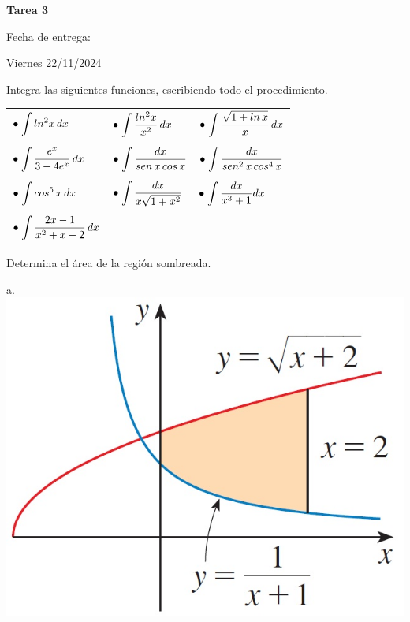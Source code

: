 \documentclass[9pt]{exam}
\begin{document}
\centering


\Large 
\textbf{Tarea 3}

\normalsize
\normalsize
Fecha de entrega: 

Viernes 22/11/2024 



\pointformat{\bfseries\boldmath(\thepoints)}
\vskip10pt

\begin{questions}
   \question Integra las siguientes funciones, escribiendo todo el procedimiento. 
    \vskip10pt
    
    \begin{tabular}{p{5cm}p{5cm}p{5cm}}
         $\bullet\;\mathlarger{\int ln^2x\,dx}$&$\bullet\;\mathlarger{\int \frac{ln^2x}{x^2}\,dx}$&$\bullet\;\mathlarger{\int \frac{\sqrt{1+ln\,x}}{x}\,dx}$  \\
         &\\
         $\bullet\;\mathlarger{\int \dfrac{e^x}{3+4e^x}\,dx}$& $\bullet\;\mathlarger{\int \dfrac{dx}{sen\,x\, cos \,x}}$&$\bullet\;\mathlarger{\int \dfrac{dx}{sen^2 \,x\, cos^4 \,x}}$ \\
         &\\
         $\bullet\;\mathlarger{\int cos^5\, x\, dx}$& $\bullet\;\mathlarger{\int \dfrac{dx}{x\sqrt{1+x^2}}}$&$\bullet\;\mathlarger{\int \dfrac{dx}{x^3 +1}dx}$ \\
         &\\
         $\bullet\;\mathlarger{\int \dfrac{2x-1}{x^2+x-2}}\, dx$
    \end{tabular}{}
   \vskip10pt  
    \question Determina el área de la región sombreada.
    \begin{multicols}{2}
    a. \includegraphics[scale=.3]{T-E3_1.jpg}
    

\end{multicols}
\end{questions}
\end{document}
